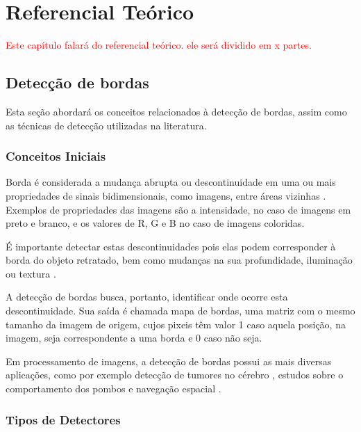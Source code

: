 \chapter{Referencial Teórico} \label{refteor}

\textcolor{red}{Este capítulo falará do referencial teórico. ele será dividido em x partes.}

\section{Detecção de bordas}

Esta seção abordará os conceitos relacionados à detecção de bordas, assim como as técnicas de detecção utilizadas na literatura.

\subsection{Conceitos Iniciais}

Borda é considerada a mudança abrupta ou descontinuidade em uma ou mais propriedades de sinais bidimensionais, como imagens, entre áreas vizinhas \cite{li2009markov}. Exemplos de propriedades das imagens são a intensidade, no caso de imagens em preto e branco, e os valores de R, G e B no caso de imagens coloridas.

É importante detectar estas descontinuidades pois elas podem corresponder à borda do objeto retratado, bem como mudanças na sua profundidade, iluminação ou textura \cite{descontinuidades}.


A detecção de bordas busca, portanto, identificar onde ocorre esta descontinuidade. Sua saída é chamada mapa de bordas, uma matriz com o mesmo tamanho da imagem de origem, cujos pixeis têm valor 1 caso aquela posição, na imagem, seja correspondente a uma borda e 0 caso não seja.

Em processamento de imagens, a detecção de bordas possui as mais diversas aplicações, como por exemplo detecção de tumores no cérebro \cite{detectumor}, estudos sobre o comportamento dos pombos \cite{pigeon} e navegação espacial \cite{navegespacial}.

\subsection{Tipos de Detectores}

